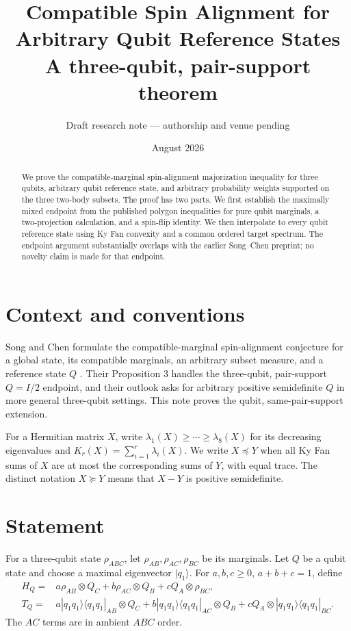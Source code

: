 \documentclass[11pt]{article}
\title{Compatible Spin Alignment for Arbitrary Qubit Reference States\\
\large A three-qubit, pair-support theorem}
\author{Draft research note --- authorship and venue pending}
\date{August 2026}
\newcommand{\KF}{K}
\begin{document}
\maketitle

\begin{abstract}
We prove the compatible-marginal spin-alignment majorization inequality for
three qubits, arbitrary qubit reference state, and arbitrary probability
weights supported on the three two-body subsets.  The proof has two parts.  We
first establish the maximally mixed endpoint from the published polygon
inequalities for pure qubit marginals, a two-projection calculation, and a
spin-flip identity.  We then interpolate to every qubit reference state using
Ky Fan convexity and a common ordered target spectrum. The endpoint argument
substantially overlaps with the earlier Song--Chen preprint; no novelty claim
is made for that endpoint.
\end{abstract}

\section{Context and conventions}

Song and Chen formulate the compatible-marginal spin-alignment conjecture for
a global state, its compatible marginals, an arbitrary subset measure, and a
reference state \(Q\) \cite[Conjecture 2]{SongChen}. Their Proposition 3
handles the three-qubit, pair-support \(Q=I/2\) endpoint, and their outlook
asks for arbitrary positive semidefinite \(Q\) in more general three-qubit
settings. This note proves the qubit, same-pair-support extension.

For a Hermitian matrix \(X\), write
\(\lambda_1(X)\ge\cdots\ge\lambda_8(X)\) for its decreasing eigenvalues and
\(\KF_r(X)=\sum_{i=1}^r\lambda_i(X)\). We write \(X\preceq Y\) when all Ky
Fan sums of \(X\) are at most the corresponding sums of \(Y\), with equal
trace. The distinct notation \(X\succeq Y\) means that \(X-Y\) is positive
semidefinite.

\section{Statement}

For a three-qubit state \(\rho_{ABC}\), let \(\rho_{AB},\rho_{AC},\rho_{BC}\)
be its marginals.  Let \(Q\) be a qubit state and choose a maximal eigenvector
\(|q_1\rangle\).  For \(a,b,c\ge0\), \(a+b+c=1\), define
\[
\begin{aligned}
H_Q={}&a\rho_{AB}\otimes Q_C+b\rho_{AC}\otimes Q_B+
cQ_A\otimes\rho_{BC},\\
T_Q={}&a|q_1q_1\rangle\!\langle q_1q_1|_{AB}\otimes Q_C+
b|q_1q_1\rangle\!\langle q_1q_1|_{AC}\otimes Q_B+
cQ_A\otimes|q_1q_1\rangle\!\langle q_1q_1|_{BC}.
\end{aligned}
\]
The \(AC\) terms are in ambient \(ABC\) order.
\end{document}
